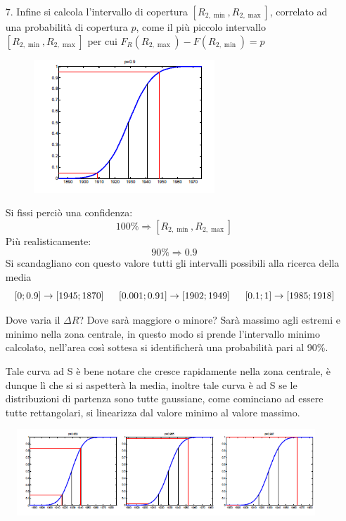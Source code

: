 \documentclass[a4paper, 15pt]{article}
\begin{document}
\begin{adjustwidth}{2in}{}
\begin{enumerate}
   			\item[7.] Infine si calcola l’intervallo di copertura $ [R_{2,\min}, R_{2,\max}] $, correlato ad una
   			probabilità di copertura $ p $, come il più piccolo intervallo $ [R_{2,\min}, R_{2,\max}] $
   			per cui $ F_R(R_{2,\max})-F(R_{2,\min} ) = p $
\begin{figure}[H]
	\centering
	\includegraphics[width=0.5\linewidth]{fig/screenshot010}
	\label{fig:screenshot010}
\end{figure}
   			Si fissi perciò una confidenza:
   			\[100\% \Rightarrow [R_{2,\min}, R_{2,\max}] \]
   			Più realisticamente:
   			\[ 90\% \Rightarrow 0.9\]
   			Si scandagliano con questo valore tutti gli intervalli possibili alla ricerca della media 
   			\[
   				[0; 0.9] \rightarrow \left[1945; 1870\right] \hspace{0.5cm }
   				[0.001; 0.91] \rightarrow \left[1902; 1949 \right] \hspace{0.5cm } 				
   				[0.1; 1] \rightarrow [1985; 1918]
   			\]
   			
   			Dove varia il $\Delta R$? Dove sarà maggiore o minore? Sarà massimo agli estremi e minimo nella zona centrale, in questo modo si prende l'intervallo minimo calcolato, nell'area così sottesa si identificherà una probabilità pari al 90\%.
   			
   			Tale curva ad S è bene notare che cresce rapidamente nella zona centrale, è dunque lì che si si aspetterà la media, inoltre tale curva è ad S se le distribuzioni di partenza sono tutte gaussiane, come cominciano ad essere tutte rettangolari, si linearizza dal valore minimo al valore massimo.  
   		\end{enumerate}   	
   	\begin{figure}[H]
   		\centering
   		\includegraphics[width=0.8\linewidth]{fig/screenshot011}
   		\label{fig:screenshot011}
   	\end{figure}
\end{adjustwidth}
\newpage
\end{document}

